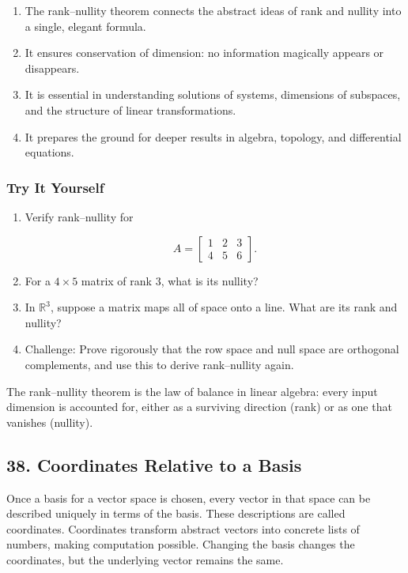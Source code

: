 \documentclass[
  letterpaper,
  DIV=11,
  numbers=noendperiod]{scrreprt}
\providecommand{\tightlist}{%
  \setlength{\itemsep}{0pt}\setlength{\parskip}{0pt}}
\begin{document}
\begin{enumerate}
\def\labelenumi{\arabic{enumi}.}
\tightlist
\item
  The rank--nullity theorem connects the abstract ideas of rank and
  nullity into a single, elegant formula.
\item
  It ensures conservation of dimension: no information magically appears
  or disappears.
\item
  It is essential in understanding solutions of systems, dimensions of
  subspaces, and the structure of linear transformations.
\item
  It prepares the ground for deeper results in algebra, topology, and
  differential equations.
\end{enumerate}

\subsubsection{Try It Yourself}\label{try-it-yourself-36}

\begin{enumerate}
\def\labelenumi{\arabic{enumi}.}
\item
  Verify rank--nullity for

  \[
  A = \begin{bmatrix}  
  1 & 2 & 3 \\  
  4 & 5 & 6  
  \end{bmatrix}.
  \]
\item
  For a \(4 \times 5\) matrix of rank 3, what is its nullity?
\item
  In \(\mathbb{R}^3\), suppose a matrix maps all of space onto a line.
  What are its rank and nullity?
\item
  Challenge: Prove rigorously that the row space and null space are
  orthogonal complements, and use this to derive rank--nullity again.
\end{enumerate}

The rank--nullity theorem is the law of balance in linear algebra: every
input dimension is accounted for, either as a surviving direction (rank)
or as one that vanishes (nullity).

\subsection{38. Coordinates Relative to a
Basis}\label{coordinates-relative-to-a-basis}

Once a basis for a vector space is chosen, every vector in that space
can be described uniquely in terms of the basis. These descriptions are
called coordinates. Coordinates transform abstract vectors into concrete
lists of numbers, making computation possible. Changing the basis
changes the coordinates, but the underlying vector remains the same.
\end{document}
